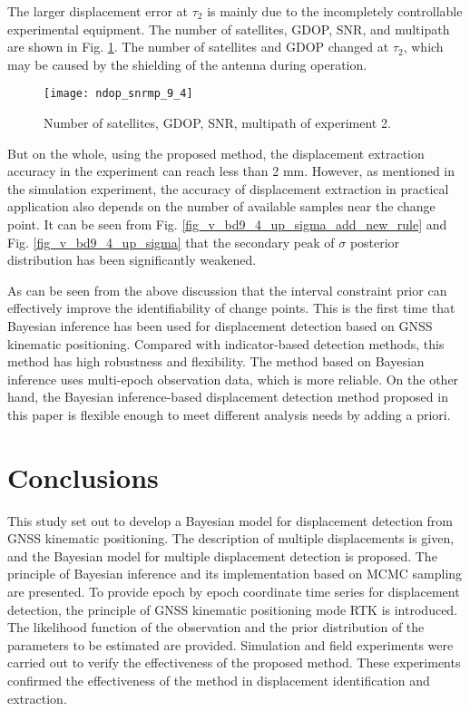 \documentclass[final,3p,times]{elsarticle}
\begin{document}
	The larger displacement error at $\tau_2$ is mainly due to the incompletely controllable experimental equipment. 
	\textcolor{r_s}{
		 The number of satellites, GDOP, SNR, and multipath are shown in Fig. \ref{fig_v_ndop_snrmp_9_4}. The number of satellites and GDOP changed at $\tau_2$, which may be caused by the shielding of the antenna during operation.}	
	\begin{figure}[htbp]
		\centering
		\texttt{[image: ndop\_snrmp\_9\_4]}
		\caption{Number of satellites, GDOP, SNR, multipath of experiment 2.}
		\label{fig_v_ndop_snrmp_9_4}
	\end{figure} 
	But on the whole, using the proposed method, the displacement extraction accuracy in the experiment can reach less than 2 mm. However, as mentioned in the simulation experiment, the accuracy of displacement extraction in practical application also depends on the number of available samples near the change point.
	It can be seen from Fig. \ref{fig_v_bd9_4_up_sigma_add_new_rule} and Fig. \ref{fig_v_bd9_4_up_sigma} that the secondary peak of $\sigma$ posterior distribution has been significantly weakened.
	
	As can be seen from the above discussion that the interval constraint prior can effectively improve the identifiability of change points.
	\textcolor{r_s}{
		This is the first time that Bayesian inference has been used for displacement detection based on GNSS kinematic positioning.
		Compared with indicator-based detection methods, this method has high robustness and flexibility.
		The method based on Bayesian inference uses multi-epoch observation data, which is more reliable.
		On the other hand, the Bayesian inference-based displacement detection method proposed in this paper is flexible enough to meet different analysis needs by adding a priori.
	}
	
	\section{Conclusions}
	\label{concl}
	This study set out to develop a Bayesian model for displacement detection from GNSS kinematic positioning. 
	The description of multiple displacements is given, and the Bayesian model for multiple displacement detection is proposed.
	The principle of Bayesian inference and its implementation based on MCMC sampling are presented.
	To provide epoch by epoch coordinate time series for displacement detection, the principle of GNSS kinematic positioning mode RTK is introduced.
	The likelihood function of the observation and the prior distribution of the parameters to be estimated are provided.
	Simulation and field experiments were carried out to verify the effectiveness of the proposed method. 
	These experiments confirmed the effectiveness of the method in displacement identification and extraction.
	
\end{document}
